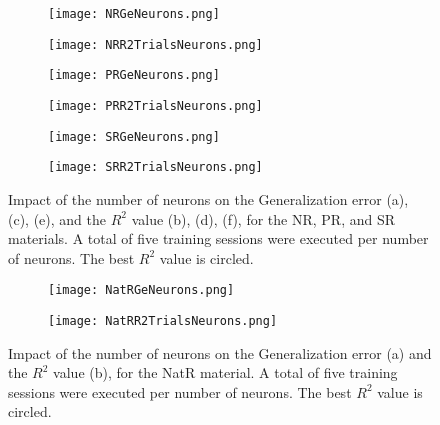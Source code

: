 \begin{figure}[htbp!]
	\centering
    \begin{subfigure}[b]{0.49\textwidth}
        \centering
        \texttt{[image: NRGeNeurons.png]}
        \caption{}
        \label{fig:GenNeuronsNR}
    \end{subfigure}
    \begin{subfigure}[b]{0.49\textwidth}
        \centering
        \texttt{[image: NRR2TrialsNeurons.png]}
        \caption{}
        \label{fig:TrialsNeuronsNR}
    \end{subfigure}
    \begin{subfigure}[b]{0.49\textwidth}
        \centering
        \texttt{[image: PRGeNeurons.png]}
        \caption{}
        \label{fig:GenNeuronsPR}
    \end{subfigure}
    \begin{subfigure}[b]{0.49\textwidth}
        \centering
        \texttt{[image: PRR2TrialsNeurons.png]}
        \caption{}
        \label{fig:TrialsNeuronsPR}
    \end{subfigure}
    \begin{subfigure}[b]{0.49\textwidth}
        \centering
        \texttt{[image: SRGeNeurons.png]}
        \caption{}
        \label{fig:GenNeuronsSR}
    \end{subfigure}
    \begin{subfigure}[b]{0.49\textwidth}
        \centering
        \texttt{[image: SRR2TrialsNeurons.png]}
        \caption{}
        \label{fig:TrialsNeuronsSR}
    \end{subfigure}
    \caption{Impact of the number of neurons on the Generalization error (a), (c), (e), and the $R^2$ value (b), (d), (f), for the NR, PR, and SR materials. A total of five training sessions were executed per number of neurons. The best $R^2$ value is circled.}
    \label{fig:TrialsNeurons2}
\end{figure}

\begin{figure}[htbp!]
	\centering
    \begin{subfigure}[b]{0.49\textwidth}
        \centering
        \texttt{[image: NatRGeNeurons.png]}
        \caption{}
        \label{fig:GenNeuronsNatR}
    \end{subfigure}
    \begin{subfigure}[b]{0.49\textwidth}
        \centering
        \texttt{[image: NatRR2TrialsNeurons.png]}
        \caption{}
        \label{fig:TrialsNeuronsNatR}
    \end{subfigure}
    \caption{Impact of the number of neurons on the Generalization error (a) and the $R^2$ value (b), for the NatR material. A total of five training sessions were executed per number of neurons. The best $R^2$ value is circled.}
    \label{fig:TrialsNeurons3}
\end{figure}

